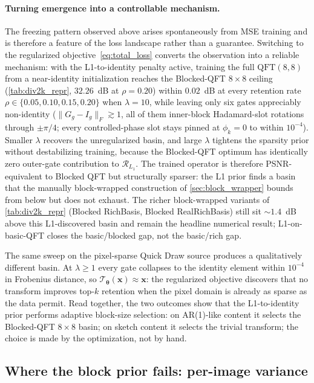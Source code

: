 \documentclass[a4paper, twocolumn]{quantumarticle}
\newcommand{\TT}{\mathcal{T}}
\begin{document}
\paragraph{Turning emergence into a controllable mechanism.}
The freezing pattern observed above arises spontaneously from MSE training and is therefore a feature of the loss landscape rather than a guarantee.
Switching to the regularized objective~\cref{eq:total_loss} converts the observation into a reliable mechanism: with the L1-to-identity penalty active, training the full $\mathrm{QFT}(8,8)$ from a near-identity initialization reaches the Blocked-QFT $8 \times 8$ ceiling (\cref{tab:div2k_repr}, $32.26$~dB at $\rho = 0.20$) within $0.02$~dB at every retention rate $\rho \in \{0.05, 0.10, 0.15, 0.20\}$ when $\lambda = 10$, while leaving only six gates appreciably non-identity ($\|G_g - I_g\|_F \gtrsim 1$, all of them inner-block Hadamard-slot rotations through $\pm \pi/4$; every controlled-phase slot stays pinned at $\phi_k = 0$ to within $10^{-4}$).
Smaller $\lambda$ recovers the unregularized basin, and large $\lambda$ tightens the sparsity prior without destabilizing training, because the Blocked-QFT optimum has identically zero outer-gate contribution to $\mathcal{R}_{L_1}$.
The trained operator is therefore PSNR-equivalent to Blocked QFT but structurally sparser: the L1 prior finds a basin that the manually block-wrapped construction of \cref{sec:block_wrapper} bounds from below but does not exhaust.
The richer block-wrapped variants of \cref{tab:div2k_repr} (Blocked RichBasis, Blocked RealRichBasis) still sit $\sim\!1.4$~dB above this L1-discovered basin and remain the headline numerical result; L1-on-basic-QFT closes the basic/blocked gap, not the basic/rich gap.

The same sweep on the pixel-sparse Quick Draw source produces a qualitatively different basin.
At $\lambda \geq 1$ every gate collapses to the identity element within $10^{-4}$ in Frobenius distance, so $\TT_{\boldsymbol{\theta}}(\mathbf{x}) \approx \mathbf{x}$: the regularized objective discovers that no transform improves top-$k$ retention when the pixel domain is already as sparse as the data permit.
Read together, the two outcomes show that the L1-to-identity prior performs adaptive block-size selection: on AR(1)-like content it selects the Blocked-QFT $8 \times 8$ basin; on sketch content it selects the trivial transform; the choice is made by the optimization, not by hand.

\subsection{Where the block prior fails: per-image variance}
\label{sec:per_image}
\end{document}
